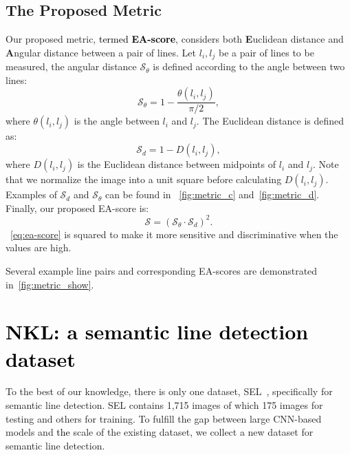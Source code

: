 \documentclass[10pt,journal,cspaper,compsoc]{IEEEtran}
\newcommand{\revise}[1]{{\textcolor{black}{#1}}}
\newcommand{\CheckRmv}[1]{}
\newcommand{\CheckRmv}[1]{#1}
\begin{document}
\CheckRmv{
\begin{figure*}[!htb]
  \centering
  \begin{overpic}[width=1\linewidth]{figures/dataset_vis.jpg}
  \end{overpic}\vspace{-8pt}
  \caption{
    Example images and annotations (yellow lines) of \revise{NKL}.
Images of \revise{NKL} present diverse scenes and rich line annotations.
  }
  \label{fig:dataset_vis}
\end{figure*}
}

\subsection{The Proposed Metric}
Our proposed metric, \revise{termed \textbf{EA-score}}, considers both 
\textbf{E}uclidean distance and \textbf{A}ngular distance
between a pair of lines.
Let $l_i, l_j$ be a pair of lines to be measured,
the angular distance $\mathcal{S}_\theta$ is defined according to the
angle between two lines:
\begin{equation}
    \mathcal{S}_\theta = 1 - \frac{\theta(l_i, l_j)}{\pi/2},
    \label{eq:sa}
\end{equation}
where $\theta(l_i, l_j)$ is the angle between $l_i$ and $l_j$.
The Euclidean distance is defined as:
\begin{equation}
    \mathcal{S}_d = 1 - D(l_i, l_j),
    \label{eq:sd}
\end{equation}
where $D(l_i, l_j)$ is the Euclidean distance between midpoints of $l_i$ and $l_j$.
Note that we normalize the image into a unit square before calculating $D(l_i, l_j)$.
Examples of $\mathcal{S}_d$ and $\mathcal{S}_\theta$ can be found in
~\cref{fig:metric_c} and~\cref{fig:metric_d}.
Finally, our proposed EA-score is:
\begin{equation}
    \mathcal{S} = (\mathcal{S}_\theta \cdot \mathcal{S}_d)^2.
    \label{eq:ea-score}
\end{equation}
~\cref{eq:ea-score} is squared to make it more sensitive and discriminative
when the values are high.

Several example line pairs and corresponding EA-scores
are demonstrated in~\cref{fig:metric_show}.

\section{\revise{NKL: a semantic line detection dataset}}\label{sec:nkl-dataset}
To the best of our knowledge, there is only one dataset, SEL~\cite{lee2017semantic},
specifically for semantic line detection.
SEL contains 1,715 images of which 175 images for testing
and others for training.
To fulfill the gap between large CNN-based models and \revise{the} scale of the existing
dataset,
we collect a new dataset for semantic line detection.
\end{document}
